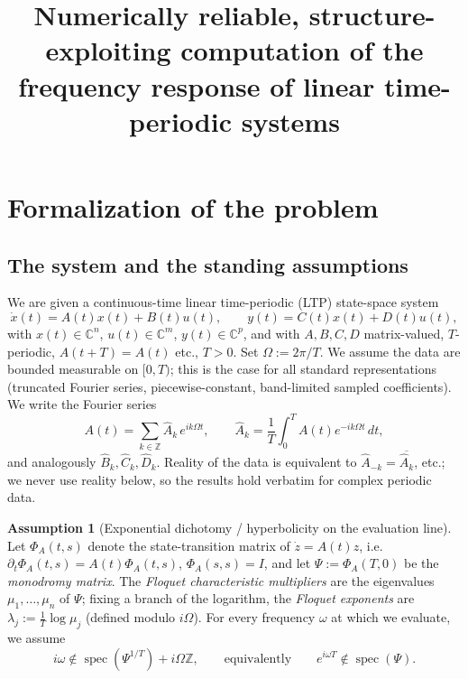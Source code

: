 \documentclass{amsart}
\theoremstyle{definition}
\newtheorem{assumption}{Assumption}
\DeclareMathOperator{\spec}{spec}
\newcommand{\C}{\mathbb{C}}
\newcommand{\Z}{\mathbb{Z}}
\begin{document}
\title{Numerically reliable, structure-exploiting computation of the frequency
response of linear time-periodic systems}
\maketitle

\section{Formalization of the problem}

\subsection{The system and the standing assumptions}
We are given a continuous-time linear time-periodic (LTP) state-space system
\begin{equation}\label{eq:sys}
\dot x(t)=A(t)x(t)+B(t)u(t),\qquad y(t)=C(t)x(t)+D(t)u(t),
\end{equation}
with $x(t)\in\C^{n}$, $u(t)\in\C^{m}$, $y(t)\in\C^{p}$, and with $A,B,C,D$
matrix-valued, $T$-periodic, $A(t+T)=A(t)$ etc., $T>0$. Set $\Omega:=2\pi/T$.
We assume the data are bounded measurable on $[0,T)$; this is the case for all
standard representations (truncated Fourier series, piecewise-constant,
band-limited sampled coefficients). We write the Fourier series
\begin{equation}\label{eq:fourier}
A(t)=\sum_{k\in\Z}\hat A_k\,e^{ik\Omega t},\qquad
\hat A_k=\frac1T\int_0^T A(t)e^{-ik\Omega t}\,dt,
\end{equation}
and analogously $\hat B_k,\hat C_k,\hat D_k$. Reality of the data is equivalent
to $\hat A_{-k}=\overline{\hat A_k}$, etc.; we never use reality below, so the
results hold verbatim for complex periodic data.

\begin{assumption}[Exponential dichotomy / hyperbolicity on the evaluation line]
\label{ass:hyp}
Let $\Phi_A(t,s)$ denote the state-transition matrix of $\dot z=A(t)z$, i.e.
$\partial_t\Phi_A(t,s)=A(t)\Phi_A(t,s)$, $\Phi_A(s,s)=I$, and let
$\Psi:=\Phi_A(T,0)$ be the \emph{monodromy matrix}. The \emph{Floquet
characteristic multipliers} are the eigenvalues $\mu_1,\dots,\mu_n$ of $\Psi$;
fixing a branch of the logarithm, the \emph{Floquet exponents} are
$\lambda_j:=\tfrac1T\log\mu_j$ (defined modulo $i\Omega$). For every frequency
$\omega$ at which we evaluate, we assume
\begin{equation}\label{eq:hyp}
i\omega\notin\spec(\Psi^{1/T})+i\Omega\Z,\qquad\text{equivalently}\qquad
e^{i\omega T}\notin\spec(\Psi).
\end{equation}
\end{assumption}
\end{document}
